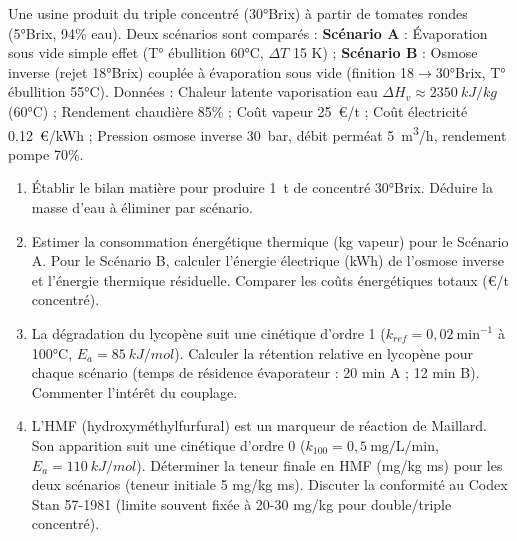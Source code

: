 \documentclass[11pt]{article}
\begin{document}
\begin{exercice}
Une usine produit du triple concentré (30°Brix) à partir de tomates rondes (5°Brix, 94\% eau). Deux scénarios sont comparés : \textbf{Scénario A} : Évaporation sous vide simple effet (T° ébullition 60°C, $\Delta T$ 15 K) ; \textbf{Scénario B} : Osmose inverse (rejet 18°Brix) couplée à évaporation sous vide (finition 18$\rightarrow$30°Brix, T° ébullition 55°C).
Données : Chaleur latente vaporisation eau $\Delta H_v \approx \SI{2350}{kJ/kg}$ (60°C) ; Rendement chaudière 85\% ; Coût vapeur \SI{25}{€/t} ; Coût électricité \SI{0,12}{€/kWh} ; Pression osmose inverse \SI{30}{bar}, débit perméat \SI{5}{m^3/h}, rendement pompe 70\%.
\begin{enumerate}
    \item Établir le bilan matière pour produire \SI{1}{t} de concentré 30°Brix. Déduire la masse d'eau à éliminer par scénario.
    \item Estimer la consommation énergétique thermique (kg vapeur) pour le Scénario A. Pour le Scénario B, calculer l'énergie électrique (kWh) de l'osmose inverse et l'énergie thermique résiduelle. Comparer les coûts énergétiques totaux (€/t concentré).
    \item La dégradation du lycopène suit une cinétique d'ordre 1 ($k_{ref}=0,02\ \text{min}^{-1}$ à 100°C, $E_a=\SI{85}{kJ/mol}$). Calculer la rétention relative en lycopène pour chaque scénario (temps de résidence évaporateur : 20 min A ; 12 min B). Commenter l'intérêt du couplage.
    \item L'HMF (hydroxyméthylfurfural) est un marqueur de réaction de Maillard. Son apparition suit une cinétique d'ordre 0 ($k_{100}=0,5\ \text{mg/L/min}$, $E_a=\SI{110}{kJ/mol}$). Déterminer la teneur finale en HMF (mg/kg ms) pour les deux scénarios (teneur initiale 5 mg/kg ms). Discuter la conformité au Codex Stan 57-1981 (limite souvent fixée à 20-30 mg/kg pour double/triple concentré).
\end{enumerate}
\end{exercice}
\end{document}

